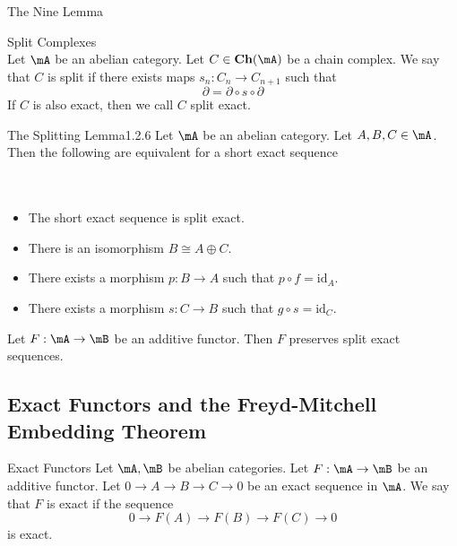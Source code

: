 \documentclass[a4paper]{article}
\begin{document}
\begin{thm}{The Nine Lemma}{}\\
\end{thm}

\begin{defn}{Split Complexes}{}\\
Let $\mA$ be an abelian category. Let $C\in\bold{Ch}(\mA)$ be a chain complex. We say that $C$ is split if there exists maps $s_n:C_n\to C_{n+1}$ such that $$\partial=\partial\circ s\circ\partial$$ If $C$ is also exact, then we call $C$ split exact. 
\end{defn}

\begin{thm}{The Splitting Lemma}{1.2.6} Let $\mA$ be an abelian category. Let $A,B,C\in\mA$. Then the following are equivalent for a short exact sequence \\~\\
\\
\begin{itemize}
\item The short exact sequence is split exact. 
\item There is an isomorphism $B\cong A\oplus C$. 
\item There exists a morphism $p:B\to A$ such that $p\circ f=\text{id}_A$. 
\item There exists a morphism $s:C\to B$ such that $g\circ s=\text{id}_C$. 
\end{itemize} 
\end{thm}

\begin{prp}{}{} Let $F:\mA\to\mB$ be an additive functor. Then $F$ preserves split exact sequences. 
\end{prp}

\subsection{Exact Functors and the Freyd-Mitchell Embedding Theorem}
\begin{defn}{Exact Functors}{} Let $\mA,\mB$ be abelian categories. Let $F:\mA\to\mB$ be an additive functor. Let $0\to A\to B\to C\to 0$ be an exact sequence in $\mA$. We say that $F$ is exact if the sequence $$0\to F(A)\to F(B)\to F(C)\to 0$$ is exact. 
\end{defn}
\end{document}
